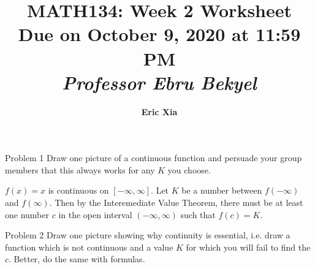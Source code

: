 \documentclass{article}
\title{
\vspace{2in}
    \textmd{\textbf{MATH134: Week 2 Worksheet}}\\
    \normalsize\vspace{0.1in}\small{Due on October 9, 2020 at 11:59 PM}\\
    \vspace{0.1in}\large{\textit{Professor Ebru Bekyel}}
    \vspace{3in}
}
\author{\textbf{Eric Xia}}
\date{}
\begin{document}
    \maketitle
    \pagebreak

    \thispagestyle{page2}

    \begin{tbhtheorem}{Problem 1}
        Draw one picture of a continuous function and persuade your group members that this always works for any $K$ you choose.
    \end{tbhtheorem}

    \begin{center}
    \end{center}

    $f(x)=x$ is continuous on $[-\infty, \infty]$. Let $K$ be a number between $f(-\infty)$ and $f(\infty)$. Then by the Interemediate Value Theorem, there must be at least one number $c$ in the open interval
    $(-\infty, \infty)$ such that $f(c)=K$.

    \begin{tbhtheorem}{Problem 2}
        Draw one picture showing why continuity is essential, i.e. draw a function which is not continuous and a value $K$ for which you will fail to find the $c$. Better, do the same with formulas.
    \end{tbhtheorem}

    \begin{center}
    \end{center}
\end{document}
